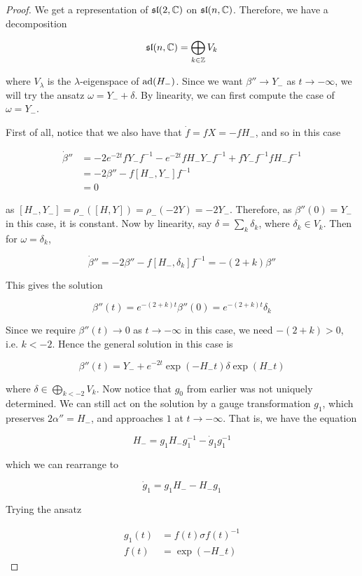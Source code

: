 \documentclass{article}
\renewcommand{\sl}{\mathfrak{sl}}
\begin{document}
\begin{proof}
    We get a representation of \(\sl(2, \C)\) on \(\sl(n, \C)\). Therefore, we have a decomposition

    \[\sl(n, \C) = \bigoplus_{k \in \Z}V_k\]

    where \(V_\lambda\) is the \(\lambda\)-eigenspace of \(\operatorname{ad}(H_-)\). Since we want \(\beta'' \to Y_-\) as \(t \to -\infty\), we will try the ansatz \(\omega = Y_- + \delta\). By linearity, we can first compute the case of \(\omega = Y_-\).

    First of all, notice that we also have that \(\dot f = f X = -fH_-\), and so in this case

    \begin{align*}
        \dot\beta'' &= -2e^{-2t}f Y_- f^{-1} - e^{-2t}f H_- Y_- f^{-1} + fY_-f^{-1}fH_-f^{-1} \\
        &= -2\beta'' - f[H_-, Y_-]f^{-1} \\
        &= 0
    \end{align*}

    as \([H_-, Y_-] = \rho_-([H, Y]) = \rho_-(-2Y) = -2Y_-\). Therefore, as \(\beta''(0) = Y_-\) in this case, it is constant. Now by linearity, say \(\delta = \sum_k \delta_k\), where \(\delta_k \in V_k\). Then for \(\omega = \delta_k\),

    \[\dot\beta'' = -2\beta'' - f[H_-, \delta_k]f^{-1} = -(2+k)\beta''\]

    This gives the solution

    \[\beta''(t) = e^{-(2+k)t}\beta''(0) = e^{-(2+k)t}\delta_k\]

    Since we require \(\beta''(t) \to 0\) as \(t \to -\infty\) in this case, we need \(-(2+k) > 0\), i.e. \(k < -2\). Hence the general solution in this case is

    \[\beta''(t) = Y_- + e^{-2t}\exp(-H_-t)\delta\exp(H_-t)\]

    where \(\delta \in \bigoplus\limits_{k < -2}V_k\). Now notice that \(g_0\) from earlier was not uniquely determined. We can still act on the solution by a gauge transformation \(g_1\), which preserves \(2\alpha'' = H_-\), and approaches \(1\) at \(t \to -\infty\). That is, we have the equation

    \[H_- = g_1H_-g_1^{-1} - \dot g_1 g_1^{-1}\]

    which we can rearrange to

    \[\dot g_1 = g_1H_- - H_- g_1\]

    Trying the ansatz

    \begin{align*}
        g_1(t) &= f(t)\sigma f(t)^{-1} \\
        f(t) &= \exp(-H_- t)
    \end{align*}


\end{proof}
\end{document}
